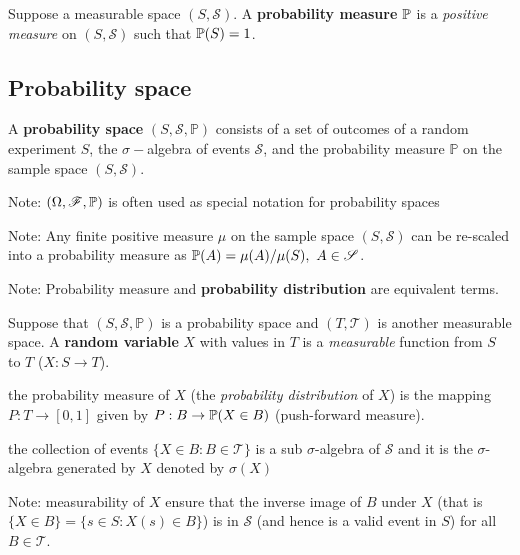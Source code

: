 \begin{definition}\label{defpre:probMeasure}
Suppose a measurable space $(S, \mathscr{S})$. 
A \textbf{probability measure} $\mathbb{P}$ is a \emph{positive measure} on $(S, \mathscr{S})$ such that $\mathbb{P}(S) = 1$.

\subsection{Probability space}


\begin{definition}
A \textbf{probability space} $(S, \mathscr{S}, \mathbb{P})$ consists of a set of outcomes of a random experiment $S$, the $\sigma-$algebra of events $\mathscr{S}$, and the probability measure $\mathbb{P}$ on the sample space $(S, \mathscr{S})$.

Note: $(\Omega, \mathscr{F}, \mathbb{P})$ is often used as special notation for probability spaces 
\end{definition}


Note: Any finite positive measure $\mu$ on the sample space $(S, \mathscr{S})$ can be re-scaled into a probability measure as $\mathbb{P}(A) = \mu(A) / \mu(S), \ A \in \mathscr{S}$.

Note: Probability measure and \textbf{probability distribution} are equivalent terms.
\end{definition}

\begin{definition}
Suppose that $(S, \mathscr{S}, \mathbb{P})$ is a probability space and $(T, \mathscr{T})$ is another measurable space.
A \textbf{random variable} $X$ with values in $T$ is a \emph{measurable} function from $S$ to $T$ ($X: S \to T$).
\begin{compactitem}
\item the probability measure of $X$ (the \emph{probability distribution} of $X$) is the mapping $P : T \to [0, 1]$ given by $P : B \to \mathbb{P}(X \in B)$ (push-forward measure).
\item the collection of events $\{ X \in B : B \in \mathscr{T} \}$ is a sub $\sigma$-algebra of $\mathscr{S}$ and it is the $\sigma$-algebra generated by $X$ denoted by $\sigma(X)$
\end{compactitem}
Note: measurability of $X$ ensure that the inverse image of $B$ under $X$ (that is $\{X \in B\} = \{s \in S : X(s) \in B\}$) is in $\mathscr{S}$ (and hence is a valid event in $S$) for all $B \in \mathscr{T}$.
\end{definition}

